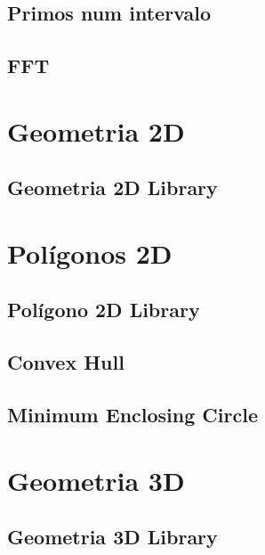 \subsection{Primos num intervalo}
\raggedbottom
\hrulefill
\subsection{FFT}
\raggedbottom
\hrulefill

\section{Geometria 2D}
\subsection{Geometria 2D Library}
\raggedbottom
\hrulefill

\section{Polígonos 2D}
\subsection{Polígono 2D Library}
\raggedbottom
\hrulefill
\subsection{Convex Hull}
\raggedbottom
\hrulefill
\subsection{Minimum Enclosing Circle}
\raggedbottom
\hrulefill

\section{Geometria 3D}
\subsection{Geometria 3D Library}
\raggedbottom
\hrulefill


